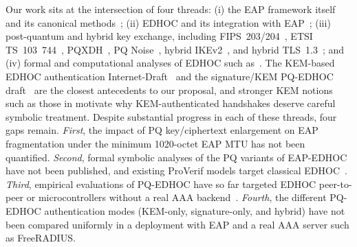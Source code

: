 \documentclass{easychair}
\begin{document}
Our work sits at the intersection of four threads: (i) the EAP framework
itself and its canonical methods~\cite{RFC3748,RFC5216,RFC4187,RFC4764};
(ii) EDHOC and its integration with EAP~\cite{RFC9528,RFC9529,LAKE,RFC-EAP-EDHOC,LopezGomez2026,FVW24};
(iii) post-quantum and hybrid key exchange, including FIPS~203/204~\cite{FIPS203,FIPS204},
ETSI TS~103~744~\cite{TS103744}, PQXDH~\cite{PQXDH,FG24}, PQ
Noise~\cite{ADH+22}, hybrid IKEv2~\cite{RFC9370}, and hybrid
TLS~1.3~\cite{TLS}; and (iv) formal and computational analyses of EDHOC such
as~\cite{KDL+21,NSB21,CP22,GM23,JKK+23,Fer24,PSM+24}. The KEM-based
EDHOC authentication Internet-Draft~\cite{pocero} and the
signature/KEM PQ-EDHOC draft~\cite{pq-edhoc-draft} are the closest
antecedents to our proposal, and stronger KEM notions such as those in
\cite{CDM24} motivate why KEM-authenticated handshakes deserve careful
symbolic treatment. Despite substantial progress in each of these threads, four gaps remain. \emph{First}, the impact of PQ key/ciphertext enlargement on EAP fragmentation under the minimum 1020-octet EAP MTU has not been quantified. \emph{Second}, formal symbolic analyses of the PQ variants of EAP-EDHOC have not been published, and existing ProVerif models target classical EDHOC~\cite{NSB21,JKK+23}. \emph{Third}, empirical evaluations of PQ-EDHOC have so far targeted EDHOC peer-to-peer or microcontrollers without a real AAA backend~\cite{FTK+25,FKF25}. \emph{Fourth}, the different PQ-EDHOC authentication modes (KEM-only, signature-only, and hybrid) have not been compared uniformly in a deployment with EAP and a real AAA server such as FreeRADIUS.
\end{document}
